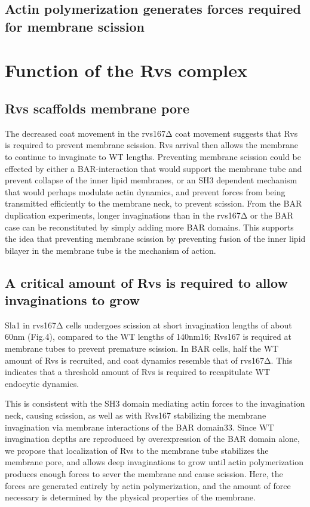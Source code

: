 \subsection{ Actin polymerization generates forces required for membrane scission}

\section{Function of the Rvs complex}

\subsection{Rvs scaffolds membrane pore}
The decreased coat movement in the rvs167Δ coat movement suggests that Rvs is required to prevent membrane scission. Rvs arrival then allows the membrane to continue to invaginate to WT lengths. Preventing membrane scission could be effected by either a BAR-interaction that would support the membrane tube and prevent collapse of the inner lipid membranes, or an SH3 dependent mechanism that would perhaps modulate actin dynamics, and prevent forces from being transmitted efficiently to the membrane neck, to prevent scission. From the BAR duplication experiments, longer invaginations than in the rvs167Δ or the BAR case can be reconstituted by simply adding more BAR domains. This supports the idea that preventing membrane scission by preventing fusion of the inner lipid bilayer in the membrane tube is the mechanism of action. 

\subsection{A critical amount of Rvs is required to allow invaginations to grow}

Sla1 in rvs167Δ cells undergoes scission at short invagination lengths of about 60nm (Fig.4), compared to the WT lengths of 140nm16; Rvs167 is required at membrane tubes to prevent premature scission. In BAR cells, half the WT amount of Rvs is recruited, and coat dynamics resemble that of rvs167Δ. This indicates that a threshold amount of Rvs is required to recapitulate WT endocytic dynamics. 

This is consistent with the SH3 domain mediating actin forces to the invagination neck, causing scission, as well as with Rvs167 stabilizing the membrane invagination via membrane interactions of the BAR domain33. Since WT invagination depths are reproduced by overexpression of the BAR domain alone, we propose that localization of Rvs to the membrane tube stabilizes the membrane pore, and allows deep invaginations to grow until actin polymerization produces enough forces to sever the membrane and cause scission. Here, the forces are generated entirely by actin polymerization, and the amount of force necessary is determined by the physical properties of the membrane.




